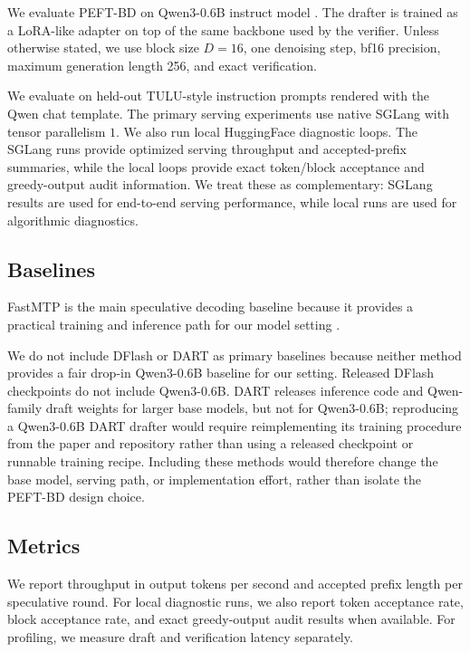 \documentclass[11pt]{article}
\begin{document}
We evaluate PEFT-BD on Qwen3-0.6B instruct model \citep{qwen3}. The drafter is trained as a LoRA-like adapter on top of the same backbone used by the verifier. Unless otherwise stated, we use block size $D=16$, one denoising step, bf16 precision, maximum generation length 256, and exact verification.

We evaluate on held-out TULU-style instruction prompts rendered with the Qwen chat template. The primary serving experiments use native SGLang with tensor parallelism $1$. We also run local HuggingFace diagnostic loops. The SGLang runs provide optimized serving throughput and accepted-prefix summaries, while the local loops provide exact token/block acceptance and greedy-output audit information. We treat these as complementary: SGLang results are used for end-to-end serving performance, while local runs are used for algorithmic diagnostics.

\subsection{Baselines}

FastMTP is the main speculative decoding baseline because it provides a practical training and inference path for our model setting \citep{fastmtp}.


We do not include DFlash or DART as primary baselines
because neither method provides a fair drop-in Qwen3-0.6B baseline for our setting. Released DFlash checkpoints do not include Qwen3-0.6B.
DART releases inference code and Qwen-family draft weights for larger
base models, but not for Qwen3-0.6B; reproducing a Qwen3-0.6B DART
drafter would require reimplementing its training procedure from the
paper and repository rather than using a released checkpoint or runnable
training recipe. Including these methods would therefore change the base
model, serving path, or implementation effort, rather than isolate the
PEFT-BD design choice.

\subsection{Metrics}

We report throughput in output tokens per second and accepted prefix length per speculative round. For local diagnostic runs, we also report token acceptance rate, block acceptance rate, and exact greedy-output audit results when available. For profiling, we measure draft and verification latency separately.
\end{document}
